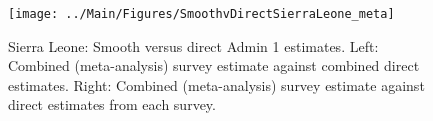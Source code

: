 \documentclass[12pt]{article}\usepackage[]{graphicx}\usepackage[]{color}
\newenvironment{knitrout}{}{} %
\begin{document}

\begin{knitrout}
\color{fgcolor}\begin{figure}[bht]

{\centering \texttt{[image: ../Main/Figures/SmoothvDirectSierraLeone\_meta]} 

}

\caption[Sierra Leone]{Sierra Leone: Smooth versus direct Admin 1 estimates. Left: Combined (meta-analysis) survey estimate against combined direct estimates. Right: Combined (meta-analysis) survey estimate against direct estimates from each survey.}\label{fig:unnamed-chunk-293}
\end{figure}


\end{knitrout}
\end{document}
